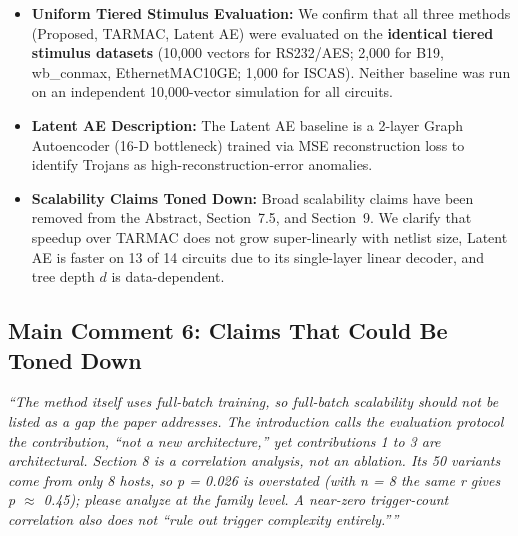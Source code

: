 \documentclass[11pt,a4paper]{article}
\newcommand{\reviewercomment}[1]{\vspace{4pt}\noindent\textcolor{revcomment}{\textit{``#1''}}\vspace{4pt}}
\begin{document}
\begin{itemize}[leftmargin=*]
    \item \textbf{Uniform Tiered Stimulus Evaluation:} We confirm that all three methods (Proposed, TARMAC, Latent AE) were evaluated on the \textbf{identical tiered stimulus datasets} (10,000 vectors for RS232/AES; 2,000 for B19, wb\_conmax, EthernetMAC10GE; 1,000 for ISCAS). Neither baseline was run on an independent 10,000-vector simulation for all circuits.

    \item \textbf{Latent AE Description:} The Latent AE baseline is a 2-layer Graph Autoencoder (16-D bottleneck) trained via MSE reconstruction loss to identify Trojans as high-reconstruction-error anomalies.

    \item \textbf{Scalability Claims Toned Down:} Broad scalability claims have been removed from the Abstract, Section~7.5, and Section~9. We clarify that speedup over TARMAC does not grow super-linearly with netlist size, Latent AE is faster on 13 of 14 circuits due to its single-layer linear decoder, and tree depth $d$ is data-dependent.
\end{itemize}

\subsection*{Main Comment 6: Claims That Could Be Toned Down}

\reviewercomment{The method itself uses full-batch training, so full-batch scalability should not be listed as a gap the paper addresses. The introduction calls the evaluation protocol the contribution, ``not a new architecture,'' yet contributions 1 to 3 are architectural. Section 8 is a correlation analysis, not an ablation. Its 50 variants come from only 8 hosts, so p = 0.026 is overstated (with n = 8 the same r gives p $\approx$ 0.45); please analyze at the family level. A near-zero trigger-count correlation also does not ``rule out trigger complexity entirely.''}
\end{document}
